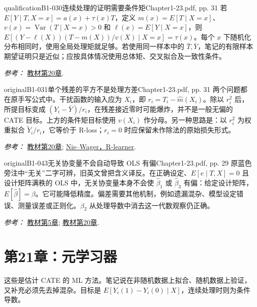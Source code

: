 {\begin{reviewnote}{qualification}{B1-030}{连续处理的证明需要条件矩}{Chapter1-23.pdf, pp. 31}
若 $E[Y\mid T,X=x]=a(x)+\tau(x)T$，定义 $m(x)=E[T\mid X=x]$、$v(x)=\operatorname{Var}(T\mid X=x)>0$ 和 $\ell(x)=E[Y\mid X=x]$，则 $E[(Y-\ell(X))(T-m(X))/v(X)\mid X=x]=\tau(x)$。每个 $x$ 下随机化分布相同时，使用全局处理矩就足够。若使用同一样本中的 $\bar T,\bar Y$，笔记的有限样本期望证明只是近似；应按具体情况使用总体矩、交叉拟合及一致性条件。
\par\smallskip\textit{参考：} \href{https://matheusfacure.github.io/python-causality-handbook/20-Plug-and-Play-Estimators.html}{教材第20章}.
\end{reviewnote}

\begin{reviewnote}{original}{B1-031}{单个残差的平方不是处理方差}{Chapter1-23.pdf, pp. 31}
两个问题都在原手写公式中。干扰函数的输入应为 $X_i$，即 $r_i=T_i-\hat m(X_i)$。除以 $r_i^2$ 后，所提目标变成 $(Y_i-\bar Y)/r_i$，在残差接近零时可能爆炸，并不是一般无偏的 CATE 目标。上方的条件矩目标使用 $v(X_i)$ 作分母。另一种思路是：以 $r_i^2$ 为权重拟合 $\widetilde Y_i/r_i$，它等价于 R-loss；$r_i=0$ 时应保留未作除法的原始损失形式。
\par\smallskip\textit{参考：} \href{https://matheusfacure.github.io/python-causality-handbook/20-Plug-and-Play-Estimators.html}{教材第20章}; \href{https://arxiv.org/abs/1712.04912}{Nie--Wager，R-learner}.
\end{reviewnote}
\begin{reviewnote}{original}{B1-043}{无关协变量不会自动导致 OLS 有偏}{Chapter1-23.pdf, pp. 29}
原蓝色旁注中“无关”二字可辨，旧英文曾把含义译反。在正确设定、$E[e\mid T,X]=0$ 且设计矩阵满秩的 OLS 中，无关协变量本身不会使 $\hat\beta_1$ 或 $\hat\beta_3$ 有偏：给定设计矩阵，$E[\hat\beta]=\beta$。它可能降低精度。偏差需要其他机制，例如遗漏混杂、模型设定错误、测量误差或正则化。$\beta_2$ 从处理导数中消去这一代数观察仍正确。
\par\smallskip\textit{参考：} \href{https://matheusfacure.github.io/python-causality-handbook/05-The-Unreasonable-Effectiveness-of-Linear-Regression.html}{教材第5章}; \href{https://matheusfacure.github.io/python-causality-handbook/20-Plug-and-Play-Estimators.html}{教材第20章}.
\end{reviewnote}

\section{第21章：元学习器}
这些是估计 CATE 的 ML 方法。笔记说在非随机数据上拟合、随机数据上验证，又补充必须先去掉混杂。目标是 $E[Y_i(1)-Y_i(0)\mid X]$，连续处理时则为条件导数。

}
